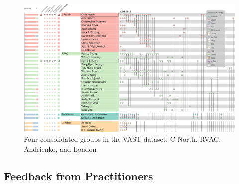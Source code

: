 \begin{figure}[!ht]
\centering
\includegraphics[width=\linewidth]{static/figures/PK-Clustering/VISPaperFigures/vast_some_consolidated_groups.png}
\caption{Four consolidated groups in the VAST dataset: C North, RVAC, Andrienko, and London}
\label{fig:PK-vast_some_consolidated_groups}
\end{figure}





\subsection{Feedback from Practitioners}

